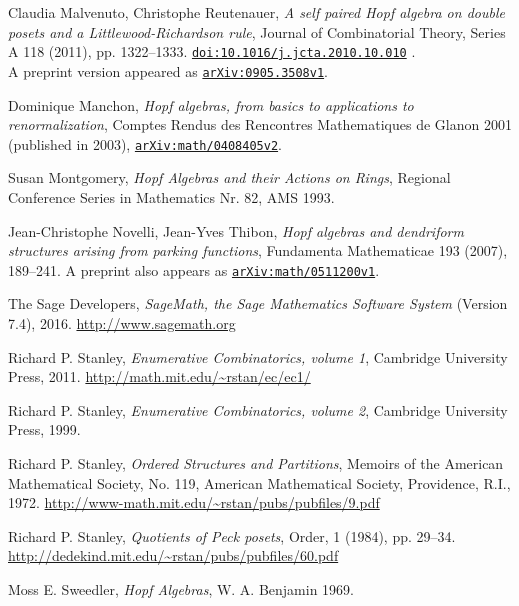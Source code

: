 \documentclass[12pt]{article}
\theoremstyle{plain}
\theoremstyle{definition}
\theoremstyle{remark}
\newcommand{\doi}[1]{\href{http://dx.doi.org/#1}{\texttt{doi:#1}}}
\newcommand{\arxiv}[1]{\href{http://arxiv.org/abs/#1}{\texttt{arXiv:#1}}}
\begin{document}
\begin{thebibliography}{10}
Claudia Malvenuto, Christophe Reutenauer,
\textit{A self paired Hopf algebra on double posets and
a Littlewood-Richardson rule},
Journal of Combinatorial Theory, Series A 118 (2011), pp. 1322--1333.
\newline
\doi{10.1016/j.jcta.2010.10.010} . \\
A preprint version appeared as
\arxiv{0905.3508v1}.

Dominique Manchon, \textit{Hopf algebras, from
basics to applications to renormalization}, Comptes Rendus des Rencontres
Mathematiques de Glanon 2001 (published in 2003), \arxiv{math/0408405v2}.

Susan Montgomery, \textit{Hopf Algebras and their
Actions on Rings}, Regional Conference Series in Mathematics Nr. 82, AMS 1993.

 Jean-Christophe Novelli, Jean-Yves Thibon,
\textit{Hopf algebras and dendriform structures arising from parking functions},
Fundamenta Mathematicae 193 (2007), 189--241. A preprint also appears
as \arxiv{math/0511200v1}.

The Sage Developers, \textit{SageMath,
the Sage Mathematics Software System} (Version 7.4), 2016.
\url{http://www.sagemath.org}

Richard P. Stanley, \textit{Enumerative
Combinatorics, volume 1}, Cambridge University Press, 2011. \newline%
\url{http://math.mit.edu/~rstan/ec/ec1/}

Richard P. Stanley, \textit{Enumerative
Combinatorics, volume 2}, Cambridge University Press, 1999.

Richard P. Stanley, \textit{Ordered Structures and
Partitions}, Memoirs of the American Mathematical Society, No. 119, American
Mathematical Society, Providence, R.I., 1972. \newline
\url{http://www-math.mit.edu/~rstan/pubs/pubfiles/9.pdf}

Richard P. Stanley,
\textit{Quotients of Peck posets}, Order, 1 (1984), pp. 29--34. \newline
\url{http://dedekind.mit.edu/~rstan/pubs/pubfiles/60.pdf}

Moss E. Sweedler, \textit{Hopf Algebras},
W. A. Benjamin 1969.

\end{thebibliography}
\end{document}
